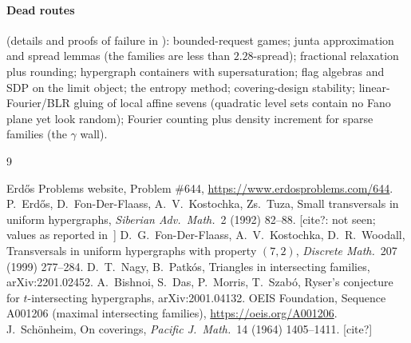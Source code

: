 \documentclass[11pt]{article}
\theoremstyle{definition}
\newcommand{\file}[1]{\path{#1}}
\begin{document}
\paragraph{Dead routes} (details and proofs of failure in \file{reports/FAILED_ROUTES.pdf}): bounded-request games;
junta approximation and spread lemmas (the families are less than $2.28$-spread); fractional relaxation plus rounding;
hypergraph containers with supersaturation; flag algebras and SDP on the limit object; the entropy method; covering-design
stability; linear-Fourier/BLR gluing of local affine sevens (quadratic level sets contain no Fano plane yet look
random); Fourier counting plus density increment for sparse families (the $\gamma$ wall).

\begin{thebibliography}{9}\small\raggedright
{} Erd\H{o}s Problems website, Problem \#644, \url{https://www.erdosproblems.com/644}.
 P.~Erd\H{o}s, D.~Fon-Der-Flaass, A.~V.~Kostochka, Zs.~Tuza, Small transversals in uniform
hypergraphs, \emph{Siberian Adv.\ Math.}\ 2 (1992) 82--88. [cite?: not seen; values as reported in~\cite{EP}]
 D.~G.~Fon-Der-Flaass, A.~V.~Kostochka, D.~R.~Woodall, Transversals in uniform hypergraphs with property
$(7,2)$, \emph{Discrete Math.}\ 207 (1999) 277--284.
 D.~T.~Nagy, B.~Patk\'os, Triangles in intersecting families, arXiv:2201.02452.
 A.~Bishnoi, S.~Das, P.~Morris, T.~Szab\'o, Ryser's conjecture for $t$-intersecting hypergraphs,
arXiv:2001.04132.
 OEIS Foundation, Sequence A001206 (maximal intersecting families), \url{https://oeis.org/A001206}.
 J.~Sch\"onheim, On coverings, \emph{Pacific J.\ Math.}\ 14 (1964) 1405--1411. [cite?]
\end{thebibliography}
\end{document}
